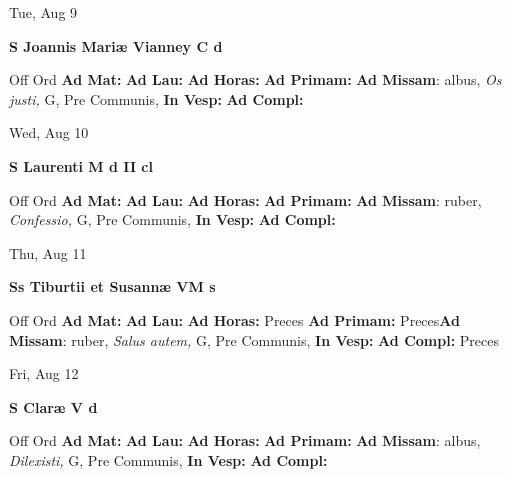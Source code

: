 \documentclass[10pt]{memoir}
\begin{document}
\begin{center}
\begin{minipage}{3.5in}
\vspace{2em}
\begin{center}Tue, Aug 9
\end{center}
\textbf{ \large S Joannis Mariæ Vianney C
\textnormal{\normalsize d}}

\begin{justify}Off Ord
\textbf{Ad Mat: }
\textbf{Ad Lau: }
\textbf{Ad Horas: }
\textbf{Ad Primam: }\textbf{Ad Missam}: albus, \textit{Os justi,} G, Pre Communis, 
\textbf{In Vesp: }
\textbf{Ad Compl: }
\end{justify}
\end{minipage}
\end{center}

\begin{center}
\begin{minipage}{3.5in}
\vspace{2em}
\begin{center}Wed, Aug 10
\end{center}
\textbf{ \large S Laurenti M
\textnormal{\normalsize d II cl}}

\begin{justify}Off Ord
\textbf{Ad Mat: }
\textbf{Ad Lau: }
\textbf{Ad Horas: }
\textbf{Ad Primam: }\textbf{Ad Missam}: ruber, \textit{Confessio,} G, Pre Communis, 
\textbf{In Vesp: }
\textbf{Ad Compl: }
\end{justify}
\end{minipage}
\end{center}

\begin{center}
\begin{minipage}{3.5in}
\vspace{2em}
\begin{center}Thu, Aug 11
\end{center}
\textbf{ \large Ss Tiburtii et Susannæ VM
\textnormal{\normalsize s}}

\begin{justify}Off Ord
\textbf{Ad Mat: }
\textbf{Ad Lau: }
\textbf{Ad Horas: }Preces
\textbf{Ad Primam: }Preces\textbf{Ad Missam}: ruber, \textit{Salus autem,} G, Pre Communis, 
\textbf{In Vesp: }
\textbf{Ad Compl: }Preces
\end{justify}
\end{minipage}
\end{center}

\begin{center}
\begin{minipage}{3.5in}
\vspace{2em}
\begin{center}Fri, Aug 12
\end{center}
\textbf{ \large S Claræ V
\textnormal{\normalsize d}}

\begin{justify}Off Ord
\textbf{Ad Mat: }
\textbf{Ad Lau: }
\textbf{Ad Horas: }
\textbf{Ad Primam: }\textbf{Ad Missam}: albus, \textit{Dilexisti,} G, Pre Communis, 
\textbf{In Vesp: }
\textbf{Ad Compl: }
\end{justify}
\end{minipage}
\end{center}
\end{document}
